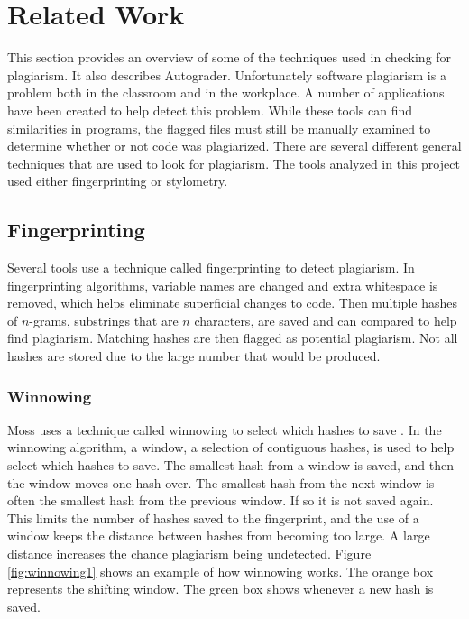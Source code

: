 \documentclass[10pt,journal,compsoc]{IEEEtran}
\begin{document}
	\section{Related Work}
	This section provides an overview of some of the techniques used in checking for plagiarism. It also describes Autograder. Unfortunately software plagiarism is a problem both in the classroom and in the workplace. A number of applications have been created to help detect this problem. While these tools can find similarities in programs, the flagged files must still be manually examined to determine whether or not code was plagiarized. There are several different general techniques that are used to look for plagiarism. The tools analyzed in this project used either fingerprinting or stylometry.
		
		\subsection{Fingerprinting}
		Several tools use a technique called fingerprinting to detect plagiarism. In fingerprinting algorithms, variable names are changed and extra whitespace is removed, which helps eliminate superficial changes to code. Then multiple hashes of $n$-grams, substrings that are $n$ characters, are saved and can compared to help find plagiarism. Matching hashes are then flagged as potential plagiarism. Not all hashes are stored due to the large number that would be produced.
		
			\subsubsection{Winnowing}
			Moss uses a technique called winnowing to select which hashes to save \cite{schleimer+wilkerson+aiken}. In the winnowing algorithm, a window, a selection of contiguous hashes, is used to help select which hashes to save. The smallest hash from a window is saved, and then the window moves one hash over. The smallest hash from the next window is often the smallest hash from the previous window. If so it is not saved again. This limits the number of hashes saved to the fingerprint, and the use of a window keeps the distance between hashes from becoming too large. A large distance increases the chance plagiarism being undetected. Figure \ref{fig:winnowing1} shows an example of how winnowing works. The orange box represents the shifting window. The green box shows whenever a new hash is saved.
		
\end{document}
